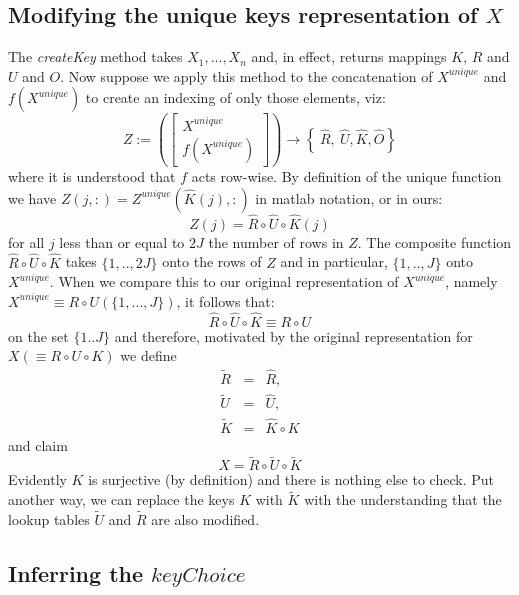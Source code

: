 \documentclass[11pt]{article}
\begin{document}
\subsection{Modifying the unique keys representation of $X$}
The {\em createKey} method takes $X_1,...,X_n$ and, in effect, returns mappings $K$, $R$ and $U$ and $O$. Now suppose we apply this method to the concatenation of $X^{unique}$ and $f(X^{unique})$ to create an indexing of only those elements, viz:
$$
         Z := \left( \left[ \begin{array}{c}  X^{unique}   \\  \hline f(X^{unique}) \end{array} \right] \right)  {\rightarrow}  \left\{   \ \hat{R},\   \hat{U},  \hat{K}, \hat{O} \right\}
$$
where it is understood that $f$ acts row-wise. By definition of the unique function we have $Z(j,:) = Z^{unique}\left( \hat{K}(j) ,:  \right)$ in matlab notation, or in ours:
$$
    Z(j) = \hat{R} \circ \hat{U} \circ \hat{K}  (j)
$$
for all $j$ less than or equal to $2J$ the number of rows in $Z$. The composite function $\hat{R} \circ \hat{U} \circ \hat{K} $ takes $\{1,..,2J\}$ onto the rows of $Z$ and in particular, $\{1,..,J\}$ onto $X^{unique}$. When we compare this to our original representation of $X^{unique}$, namely $X^{unique} \equiv R \circ U ( \{1,...,J\})$, it follows that: 
$$
    \hat{R} \circ \hat{U} \circ \hat{K}  \equiv R \circ U
$$
on the set $\{1..J\}$ and therefore, motivated by the original representation for $X \left ( \equiv R \circ U \circ K \right)$ we define
\begin{eqnarray*}
    \tilde{R} & = & \hat{R},\\
    \tilde{U} & = &  \hat{U}, \\
    \tilde{K} & = &  \hat{K} \circ K
\end{eqnarray*}
and claim 
$$
   X = \tilde{R} \circ     \tilde{U} \circ   \tilde{K}
$$
Evidently $K$ is surjective (by definition) and there is nothing else to check. Put another way, we can replace the keys $K$ with $\tilde{K}$ with the understanding that the lookup tables $\tilde{U}$ and $\tilde{R}$ are also modified. 

\subsection{Inferring the  $keyChoice$}
\end{document}
